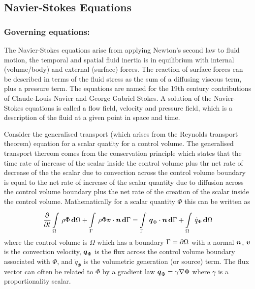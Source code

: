 
\subsection{Navier-Stokes Equations} 

\subsubsection{Governing equations:}

The Navier-Stokes equations arise from applying Newton's second law to fluid
motion, \ie the temporal and spatial fluid inertia is in equilibrium with
internal (volume/body) and external (surface) forces. The reaction of surface
forces can be described in terms of the fluid stress as the sum of a diffusing
viscous term, plus a pressure term. The equations are named for the 19th
century contributions of Claude-Louis Navier and George Gabriel Stokes. A
solution of the Navier-Stokes equations is called a flow field, \ie velocity
and pressure field, which is a description of the fluid at a given point in
space and time.

Consider the generalised transport (which arises from the Reynolds transport
theorem) equation for a scalar quatity for a control volume. The generalised
transport thereom comes from the conservation principle which states that the
time rate of increase of the scalar inside the control volume plus thr net rate
of decrease of the the scalar due to convection across the control volume
boundary is equal to the net rate of increase of the scalar quantity due to
diffusion across the control volume boundary plus the net rate of the creation
of the scalar inside the control volume. Mathematically for a scalar quantity
$\Phi$ this can be written as
\begin{equation}
  \delby{}{t}\gint{\Omega}{}{\rho\Phi}{\Omega}+\gint{\Gamma}{}{\dotprod{\rho\Phi\vectr{v}}{\vectr{n}}}{\Gamma}=
  \gint{\Gamma}{}{\dotprod{\vectr{q}_{\Phi}}{\vectr{n}}}{\Gamma}+\gint{\Omega}{}{\dot{q}_{\Phi}}{\Omega}
  \label{eqn:integralgenscalartransport}
\end{equation}
where the control volume is $\Omega$ which has a boundary
$\Gamma= \partial{\Omega} $ with a normal $\boldsymbol{n}$, $\boldsymbol{v}$ is the
convection velocity, $\boldsymbol{q}_{\Phi}$ is the flux across the control volume
boundary associated with $\Phi$, and $\dot{q}_{\Phi}$ is the volumetric
generation (or source) term. The flux vector can often be related to $\Phi$ by
a gradient law \ie $\vectr{q}_{\Phi}=\gamma\gradient{}{\Phi}$ where $\gamma$
is a proportionality scalar.


